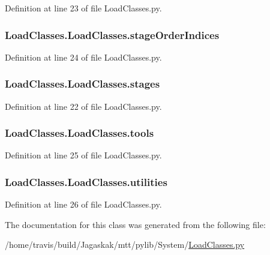 Definition at line 23 of file Load\-Classes.\-py.

\hypertarget{classLoadClasses_1_1LoadClasses_adb9a18af5fe6814c0c46e8c51f9682ef}{
\subsubsection[{stage\-Order\-Indices}]{\setlength{\rightskip}{0pt plus 5cm}Load\-Classes.\-Load\-Classes.\-stage\-Order\-Indices}}\label{classLoadClasses_1_1LoadClasses_adb9a18af5fe6814c0c46e8c51f9682ef}


Definition at line 24 of file Load\-Classes.\-py.

\hypertarget{classLoadClasses_1_1LoadClasses_aca4663cc6002ec1139e8b07f15aa1006}{
\subsubsection[{stages}]{\setlength{\rightskip}{0pt plus 5cm}Load\-Classes.\-Load\-Classes.\-stages}}\label{classLoadClasses_1_1LoadClasses_aca4663cc6002ec1139e8b07f15aa1006}


Definition at line 22 of file Load\-Classes.\-py.

\hypertarget{classLoadClasses_1_1LoadClasses_acea1357ee5b059c0c010c62d9dcdfd42}{
\subsubsection[{tools}]{\setlength{\rightskip}{0pt plus 5cm}Load\-Classes.\-Load\-Classes.\-tools}}\label{classLoadClasses_1_1LoadClasses_acea1357ee5b059c0c010c62d9dcdfd42}


Definition at line 25 of file Load\-Classes.\-py.

\hypertarget{classLoadClasses_1_1LoadClasses_a9bc5a2e86aee8dffd444ea68bc9258de}{
\subsubsection[{utilities}]{\setlength{\rightskip}{0pt plus 5cm}Load\-Classes.\-Load\-Classes.\-utilities}}\label{classLoadClasses_1_1LoadClasses_a9bc5a2e86aee8dffd444ea68bc9258de}


Definition at line 26 of file Load\-Classes.\-py.



The documentation for this class was generated from the following file\-:\begin{DoxyCompactItemize}
\item 
/home/travis/build/\-Jagaskak/mtt/pylib/\-System/\hyperlink{LoadClasses_8py}{Load\-Classes.\-py}\end{DoxyCompactItemize}
